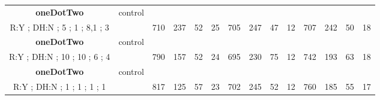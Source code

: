 \begin{table}[]
{\begin{tabular}{|c|c|c|c|c|c|c|c|c|c|c|c|c|c|}
\cellcolor{blue!15}\textbf{oneDotTwo} & control& {\color[HTML]{00009B} } & {\color[HTML]{9A0000} } & {\color[HTML]{009901} } &  & {\color[HTML]{00009B} } & {\color[HTML]{9A0000} } & {\color[HTML]{009901} } &  & {\color[HTML]{00009B} } & {\color[HTML]{9A0000} } & {\color[HTML]{009901} } &  \\ 
\cellcolor{ blue!15}R:Y ; DH:N ; 5 ; 1 ; 8,1 ; 3 &  & \multirow{-2}{*}{{\color[HTML]{00009B} 710}} & \multirow{-2}{*}{{\color[HTML]{9A0000} 237}} & \multirow{-2}{*}{{\color[HTML]{009901} 52}} & \multirow{-2}{*}{25} & \multirow{-2}{*}{{\color[HTML]{00009B} 705}} & \multirow{-2}{*}{{\color[HTML]{9A0000} 247}} & \multirow{-2}{*}{{\color[HTML]{009901} 47}} & \multirow{-2}{*}{12} & \multirow{-2}{*}{{\color[HTML]{00009B} 707}} & \multirow{-2}{*}{{\color[HTML]{9A0000} 242}} & \multirow{-2}{*}{{\color[HTML]{009901} 50}} & \multirow{-2}{*}{18} \\ \hline

\cellcolor{blue!15}\textbf{oneDotTwo} & control& {\color[HTML]{00009B} } & {\color[HTML]{9A0000} } & {\color[HTML]{009901} } &  & {\color[HTML]{00009B} } & {\color[HTML]{9A0000} } & {\color[HTML]{009901} } &  & {\color[HTML]{00009B} } & {\color[HTML]{9A0000} } & {\color[HTML]{009901} } &  \\ 
\cellcolor{ blue!15}R:Y ; DH:N ; 10 ; 10 ; 6 ; 4 &  & \multirow{-2}{*}{{\color[HTML]{00009B} 790}} & \multirow{-2}{*}{{\color[HTML]{9A0000} 157}} & \multirow{-2}{*}{{\color[HTML]{009901} 52}} & \multirow{-2}{*}{24} & \multirow{-2}{*}{{\color[HTML]{00009B} 695}} & \multirow{-2}{*}{{\color[HTML]{9A0000} 230}} & \multirow{-2}{*}{{\color[HTML]{009901} 75}} & \multirow{-2}{*}{12} & \multirow{-2}{*}{{\color[HTML]{00009B} 742}} & \multirow{-2}{*}{{\color[HTML]{9A0000} 193}} & \multirow{-2}{*}{{\color[HTML]{009901} 63}} & \multirow{-2}{*}{18} \\ \hline

\cellcolor{blue!15}\textbf{oneDotTwo} & control& {\color[HTML]{00009B} } & {\color[HTML]{9A0000} } & {\color[HTML]{009901} } &  & {\color[HTML]{00009B} } & {\color[HTML]{9A0000} } & {\color[HTML]{009901} } &  & {\color[HTML]{00009B} } & {\color[HTML]{9A0000} } & {\color[HTML]{009901} } &  \\ 
\cellcolor{ blue!15}R:Y ; DH:N ; 1 ; 1 ; 1 ; 1 &  & \multirow{-2}{*}{{\color[HTML]{00009B} 817}} & \multirow{-2}{*}{{\color[HTML]{9A0000} 125}} & \multirow{-2}{*}{{\color[HTML]{009901} 57}} & \multirow{-2}{*}{23} & \multirow{-2}{*}{{\color[HTML]{00009B} 702}} & \multirow{-2}{*}{{\color[HTML]{9A0000} 245}} & \multirow{-2}{*}{{\color[HTML]{009901} 52}} & \multirow{-2}{*}{12} & \multirow{-2}{*}{{\color[HTML]{00009B} 760}} & \multirow{-2}{*}{{\color[HTML]{9A0000} 185}} & \multirow{-2}{*}{{\color[HTML]{009901} 55}} & \multirow{-2}{*}{17} \\ \hline


\end{tabular}}
\end{table}
